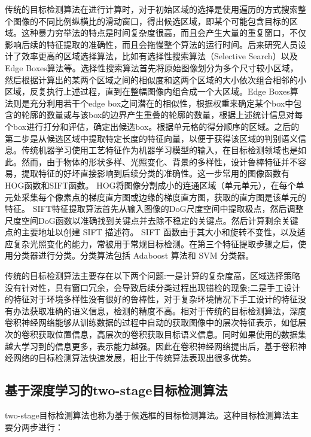 传统的目标检测算法在进行计算时，对于初始区域的选择是使用遍历的方式搜索整个图像的不同比例纵横比的滑动窗口，得出候选区域，即某个可能包含目标的区域\cite{胡伏原2020基于卷积神经网络的目标检测算法综述,kira1992feature}。这种暴力穷举法的特点是时间复杂度很高，而且会产生大量的重复窗口，不仅影响后续的特征提取的准确性，而且会拖慢整个算法的运行时间。后来研究人员设计了效率更高的区域选择算法，比如有选择性搜索算法（Selective Search）\cite{uijlings2013selective}以及Edge Boxes算法\cite{zitnick2014edge}等。选择性搜索算法首先将原始图像划分为多个尺寸较小区域，然后根据计算出的某两个区域之间的相似度和这两个区域的大小依次组合相邻的小区域，反复执行上述过程，直到在整幅图像内组合成一个大区域。Edge Boxes算法则是充分利用若干个edge box之间潜在的相似性，根据权重来确定某个box中包含的轮廓的数量或与该box的边界产生重叠的轮廓的数量，根据上述统计信息对每个box进行打分和评估，确定出候选box。根据单元格的得分顺序的区域。之后的第二步是从候选区域中提取特定长度的特征向量，以便于获得该区域的判别语义信息。传统机器学习使用工艺特征作为机器学习模型的输入，在目标检测领域也是如此。然而，由于物体的形状多样、光照变化、背景的多样性，设计鲁棒特征并不容易，提取特征的好坏直接影响到后续分类的准确性。这一步常用的图像函数有HOG函数\cite{he1990texture}和SIFT函数\cite{lowe1999object}。 HOG将图像分割成小的连通区域（单元单元），在每个单元处采集每个像素点的梯度直方图或边缘的梯度直方图，获取的直方图是该单元的特征。 SIFT特征提取算法首先从输入图像的DoG尺度空间中提取极点，然后调整尺度空间DoG函数以准确找到关键点并去除不稳定的关键点。然后计算剩余关键点的主要地址以创建 SIFT 描述符。 SIFT 函数由于其大小和旋转不变性，以及适应复杂光照变化的能力，常被用于常规目标检测。在第三个特征提取步骤之后，使用分类器进行分类。分类算法包括 Adaboost\cite{freund1997decision} 算法和 SVM\cite{cortes1995support} 分类器。


传统的目标检测算法主要存在以下两个问题:一是计算的复杂度高，区域选择策略没有针对性，具有窗口冗余，会导致后续分类过程出现错检的现象;二是手工设计的特征对于环境多样性没有很好的鲁棒性，对于复杂环境情况下手工设计的特征没有办法获取准确的语义信息，检测的精度不高。相对于传统的目标检测算法，深度卷积神经网络能够从训练数据的过程中自动的获取图像中的层次特征表示，如低层次的卷积获取位置信息，高层次的卷积获取目标语义信息。同时如果使用的数据集越大学习到的信息更多，表示能力越强。因此在卷积神经网络提出后，基于卷积神经网络的目标检测算法快速发展，相比于传统算法表现出很多优势。

\subsection{基于深度学习的two-stage目标检测算法}
two-stage目标检测算法也称为基于候选框的目标检测算法。这种目标检测算法主要分两步进行：

